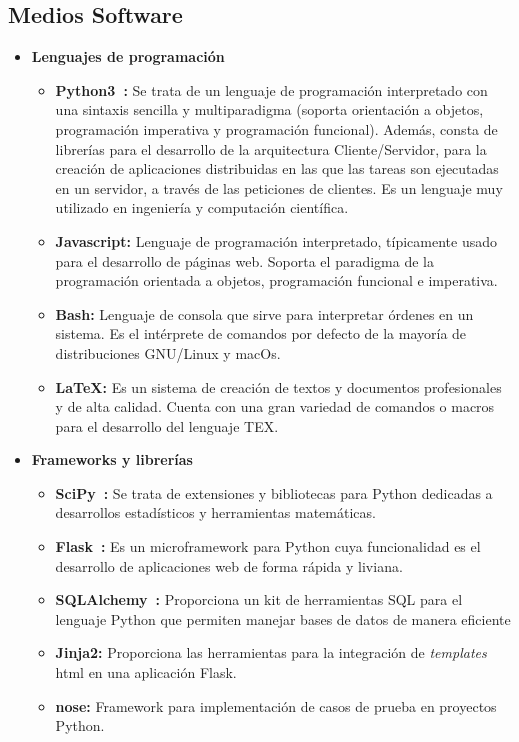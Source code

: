 \subsection{Medios Software}
\begin{itemize}
\item \textbf{Lenguajes de programación}
  \begin{itemize}
  \item \textbf{Python3~\cite{Goer04}:} Se trata de un lenguaje de programación interpretado con una sintaxis sencilla y multiparadigma (soporta orientación a objetos, programación imperativa y programación funcional). Además, consta de librerías para el desarrollo de la arquitectura Cliente/Servidor, para la creación de aplicaciones distribuidas en las que las tareas son ejecutadas en un servidor, a través de las peticiones de clientes. Es un lenguaje muy utilizado en ingeniería y computación científica.
  \item \textbf{Javascript:} Lenguaje de programación interpretado, típicamente usado para el desarrollo de páginas web. Soporta el paradigma de la programación orientada a objetos, programación funcional e imperativa.
  \item \textbf{Bash:} Lenguaje de consola que sirve para interpretar órdenes en un sistema. Es el intérprete de comandos por defecto de la mayoría de distribuciones GNU/Linux y macOs.
  \item \textbf{\LaTeX{}:} Es un sistema de creación de textos y documentos profesionales y de alta calidad. Cuenta con una gran variedad de comandos o macros para el desarrollo del lenguaje TEX.
  \end{itemize}
\item \textbf{Frameworks y librerías}
  \begin{itemize}
  \item \textbf{SciPy~\cite{Scip}:} Se trata de extensiones y bibliotecas para Python dedicadas a desarrollos estadísticos y herramientas matemáticas.
  \item \textbf{Flask~\cite{Flask}:} Es un microframework para Python cuya funcionalidad es el desarrollo de aplicaciones web de forma rápida y liviana.
  \item \textbf{SQLAlchemy~\cite{SqlAl}:} Proporciona un kit de herramientas SQL para el lenguaje Python que permiten manejar bases de datos de manera eficiente
  \item \textbf{Jinja2:} Proporciona las herramientas para la integración de \textit{templates} html en una aplicación Flask.
  \item \textbf{nose:} Framework para implementación de casos de prueba en proyectos Python.

\end{itemize}
\end{itemize}
